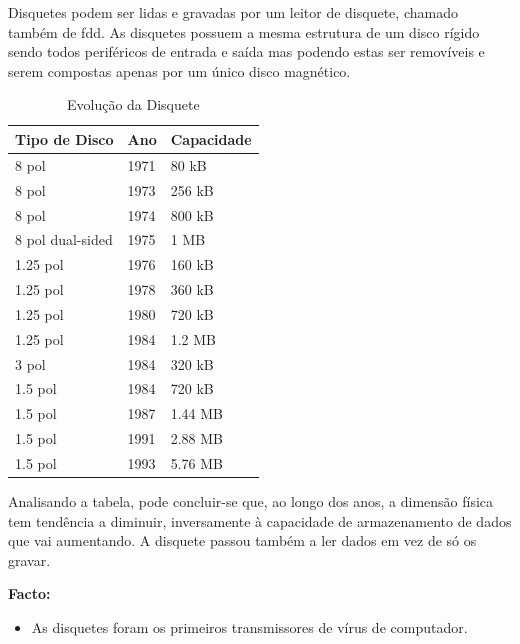 \documentclass{report}
\begin{document}
		Disquetes podem ser lidas e gravadas por um leitor de disquete, chamado também de \ac{fdd}. As disquetes possuem a mesma estrutura de um disco rígido sendo todos periféricos de entrada e saída mas podendo estas ser removíveis e serem compostas apenas por um único disco magnético.
\vspace{1mm}
		
	\begin{table}[h]
		\centering
		\caption{Evolução da Disquete}
		\vspace{2mm}
		\label{Tabela de Disquete}
		\begin{tabular}{|l|l|l|}
		\hline
		\textbf{Tipo de Disco} & \textbf{Ano} & \textbf{Capacidade} \\ \hline
		8 pol            & 1971 & 80 kB   \\ \hline
		8 pol            & 1973 & 256 kB  \\ \hline
		8 pol            & 1974 & 800 kB  \\ \hline
		8 pol dual-sided & 1975 & 1 MB    \\ \hline
		1.25 pol         & 1976 & 160 kB  \\ \hline
		1.25 pol         & 1978 & 360 kB  \\ \hline
		1.25 pol         & 1980 & 720 kB  \\ \hline
		1.25 pol         & 1984 & 1.2 MB  \\ \hline
		3 pol            & 1984 & 320 kB  \\ \hline
		1.5 pol          & 1984 & 720 kB  \\ \hline
		1.5 pol          & 1987 & 1.44 MB \\ \hline
		1.5 pol          & 1991 & 2.88 MB \\ \hline
		1.5 pol          & 1993 & 5.76 MB \\ \hline
		
		\end{tabular}
		\end{table}		
 
	Analisando a tabela, pode concluir-se que, ao longo dos anos, a dimensão física tem tendência a diminuir, inversamente à capacidade de armazenamento de dados que vai aumentando. A disquete passou também a ler dados em vez de só os gravar. 

	\textbf{Facto:}	
		\begin{itemize}
		 	\item As disquetes foram os primeiros transmissores de vírus de computador. 
	 	\end{itemize}
	
\end{document}

